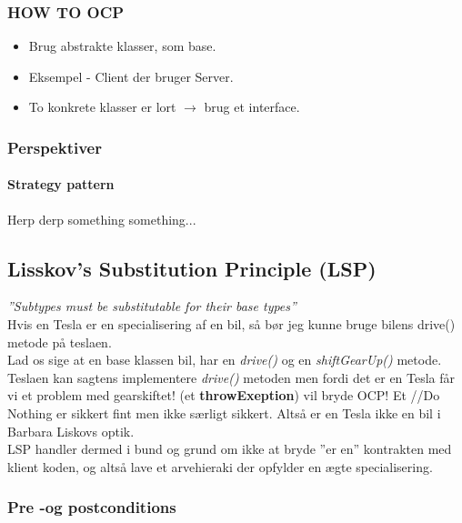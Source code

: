 \subsubsection{HOW TO OCP}

\begin{itemize}
	\item Brug abstrakte klasser, som base.
	\item Eksempel - Client der bruger Server.
	\item To konkrete klasser er lort $\longrightarrow$ brug et interface.
\end{itemize}

\subsubsection{Perspektiver}

\paragraph{Strategy pattern} 
Herp derp something something...

\subsection{Lisskov's Substitution Principle (LSP)}
\textit{''Subtypes must be substitutable for their base types''}\\

Hvis en Tesla er en specialisering af en bil, så bør jeg kunne bruge bilens drive() metode på teslaen.\\

Lad os sige at en base klassen bil, har en \textit{drive()} og en \textit{shiftGearUp()} metode. Teslaen kan sagtens implementere \textit{drive()} metoden men fordi det er en Tesla får vi et problem med gearskiftet! (et \textbf{throwExeption}) vil bryde OCP! Et \textcolor{green!60!black}{//Do Nothing} er sikkert fint men ikke særligt sikkert. Altså er en Tesla ikke en bil i Barbara Liskovs optik.\\

LSP handler dermed i bund og grund om ikke at bryde ”er en” kontrakten med klient koden, og altså lave et arvehieraki der opfylder en ægte specialisering.

\subsubsection{Pre -og postconditions}

